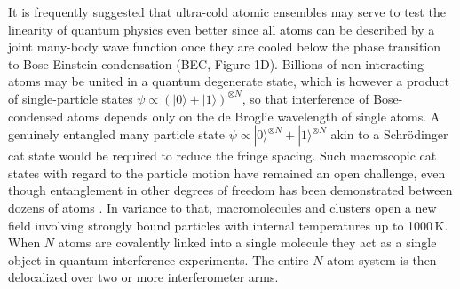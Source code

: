 \documentclass[11pt]{article}
\begin{document}
It is frequently suggested that ultra-cold atomic ensembles may serve to test the linearity of quantum physics 
even better since all atoms can be described by a joint many-body wave function once they are cooled below the phase transition to Bose-Einstein condensation (BEC, Figure 1D). 
\nocite{Kohstall2011}
Billions of non-interacting atoms may be united in a quantum degenerate state, which is however a product of single-particle states $\psi\propto(|0\rangle+|1\rangle)^{\otimes N}$, so that interference of Bose-condensed atoms depends only on the de Broglie wavelength of single atoms. A genuinely entangled many particle state $\psi\propto|0\rangle^{\otimes N}+|1\rangle^{\otimes N} $ akin to a Schr{\"o}dinger cat state would be required to reduce the fringe spacing. Such macroscopic cat states 
with regard to the particle motion
have remained an open challenge,
even though entanglement in other degrees of freedom has been demonstrated between dozens of atoms  \cite{Riedel2010,Gross2010,Sherson2006}.
In variance to that, macromolecules and clusters open a new 
field
involving strongly bound
particles 
with internal temperatures up to 1000\,K. When $N$ atoms
are covalently linked into a single molecule they act as a single object in quantum interference experiments. 
The entire $N$-atom system is then delocalized over two or more interferometer arms. 
\end{document}
